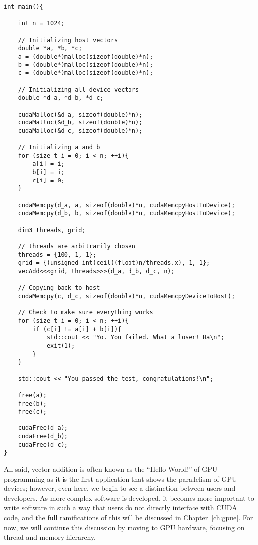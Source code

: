 \begin{lstlisting}[float,label=lst:vecaddCUDA2, style=c++,caption={An example of host code to run Listing~\ref{lst:vecaddCUDA2}.}]
int main(){

    int n = 1024;

    // Initializing host vectors
    double *a, *b, *c;
    a = (double*)malloc(sizeof(double)*n);
    b = (double*)malloc(sizeof(double)*n);
    c = (double*)malloc(sizeof(double)*n);

    // Initializing all device vectors
    double *d_a, *d_b, *d_c;

    cudaMalloc(&d_a, sizeof(double)*n);
    cudaMalloc(&d_b, sizeof(double)*n);
    cudaMalloc(&d_c, sizeof(double)*n);

    // Initializing a and b
    for (size_t i = 0; i < n; ++i){
        a[i] = i;
        b[i] = i;
        c[i] = 0;
    }

    cudaMemcpy(d_a, a, sizeof(double)*n, cudaMemcpyHostToDevice);
    cudaMemcpy(d_b, b, sizeof(double)*n, cudaMemcpyHostToDevice);

    dim3 threads, grid;

    // threads are arbitrarily chosen
    threads = {100, 1, 1};
    grid = {(unsigned int)ceil((float)n/threads.x), 1, 1};
    vecAdd<<<grid, threads>>>(d_a, d_b, d_c, n);

    // Copying back to host
    cudaMemcpy(c, d_c, sizeof(double)*n, cudaMemcpyDeviceToHost);

    // Check to make sure everything works
    for (size_t i = 0; i < n; ++i){
        if (c[i] != a[i] + b[i]){
            std::cout << "Yo. You failed. What a loser! Ha\n";
            exit(1);
        }
    }

    std::cout << "You passed the test, congratulations!\n";

    free(a);
    free(b);
    free(c);

    cudaFree(d_a);
    cudaFree(d_b);
    cudaFree(d_c);
}
\end{lstlisting}

All said, vector addition is often known as the ``Hello World!'' of GPU programming as it is the first application that shows the parallelism of GPU devices; however, even here, we begin to see a distinction between users and developers.
As more complex software is developed, it becomes more important to write software in such a way that users do not directly interface with CUDA code, and the full ramifications of this will be discussed in Chapter~\ref{ch:gpue}.
For now, we will continue this discussion by moving to GPU hardware, focusing on thread and memory hierarchy.

